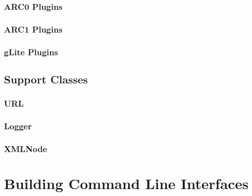 \documentclass{book}
\begin{document}
\subsection{ARC0 Plugins}
\subsection{ARC1 Plugins}
\subsection{gLite Plugins}

\section{Support Classes}
\subsection{URL}
\subsection{Logger}
\subsection{XMLNode}

\chapter{Building Command Line Interfaces}
\label{sec:cli}


\end{document}
